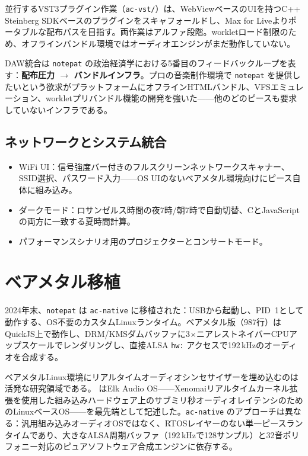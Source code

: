 \documentclass[10pt,letterpaper,twocolumn]{article}
\begin{document}
並行するVST3プラグイン作業（\texttt{ac-vst/}）は、WebViewベースのUIを持つC++ Steinberg SDKベースのプラグインをスキャフォールドし、Max for Liveよりポータブルな配布パスを目指す。両作業はアルファ段階。workletロード制限のため、オフラインバンドル環境ではオーディオエンジンがまだ動作していない。

DAW統合は \texttt{notepat} の政治経済学における5番目のフィードバックループを表す：\textbf{配布圧力 $\rightarrow$ バンドルインフラ}。プロの音楽制作環境で \texttt{notepat} を提供したいという欲求がプラットフォームにオフラインHTMLバンドル、VFSエミュレーション、workletプリバンドル機能の開発を強いた——他のどのピースも要求していないインフラである。

\subsection{ネットワークとシステム統合}

\begin{itemize}
  \item WiFi UI：信号強度バー付きのフルスクリーンネットワークスキャナー、SSID選択、パスワード入力——OS UIのないベアメタル環境向けにピース自体に組み込み。
  \item ダークモード：ロサンゼルス時間の夜7時/朝7時で自動切替、CとJavaScriptの両方に一致する夏時間計算。
  \item パフォーマンスシナリオ用のプロジェクターとコンサートモード。
\end{itemize}

\section{ベアメタル移植}

2024年末、\texttt{notepat} は \texttt{ac-native} に移植された：USBから起動し、PID~1として動作する、OS不要のカスタムLinuxランタイム。ベアメタル版（987行）はQuickJS上で動作し、DRM/KMSダムバッファに3$\times$ニアレストネイバーCPUアップスケールでレンダリングし、直接ALSA \texttt{hw:} アクセスで192\,kHzのオーディオを合成する。

ベアメタルLinux環境にリアルタイムオーディオシンセサイザーを埋め込むのは活発な研究領域である。\citet{turchet2021elk} はElk Audio OS——Xenomaiリアルタイムカーネル拡張を使用した組み込みハードウェア上のサブミリ秒オーディオレイテンシのためのLinuxベースOS——を最先端として記述した。\texttt{ac-native} のアプローチは異なる：汎用組み込みオーディオOSではなく、RTOSレイヤーのない単一ピースランタイムであり、大きなALSA周期バッファ（192\,kHzで128サンプル）と32音ポリフォニー対応のピュアソフトウェア合成エンジンに依存する。
\end{document}
